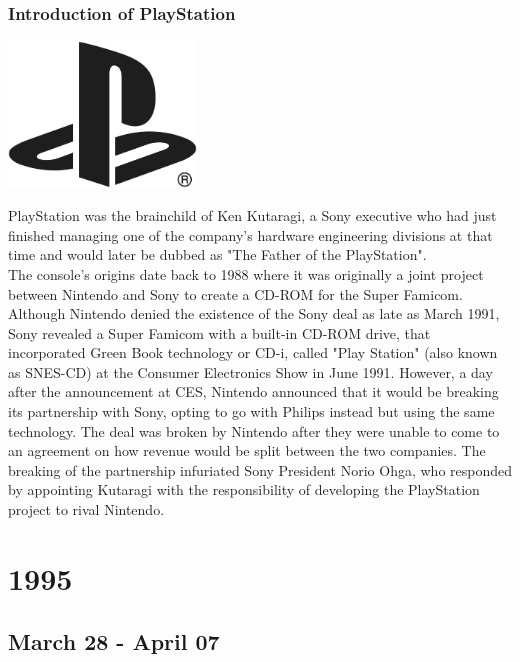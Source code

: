 \documentclass[11pt]{report}
\begin{document}
\subsection{Introduction of PlayStation}
\vspace{2mm}\begin{center}\includegraphics[width=5cm]{./img/playstationLogo.jpg}\end{center}
PlayStation was the brainchild of Ken Kutaragi, a Sony executive who had just finished managing one of the company's hardware engineering divisions at that time and would later be dubbed as "The Father of the PlayStation".\\ \indent The console's origins date back to 1988 where it was originally a joint project between Nintendo and Sony to create a CD-ROM for the Super Famicom. Although Nintendo denied the existence of the Sony deal as late as March 1991, Sony revealed a Super Famicom with a built-in CD-ROM drive, that incorporated Green Book technology or CD-i, called "Play Station" (also known as SNES-CD) at the Consumer Electronics Show in June 1991. However, a day after the announcement at CES, Nintendo announced that it would be breaking its partnership with Sony, opting to go with Philips instead but using the same technology. The deal was broken by Nintendo after they were unable to come to an agreement on how revenue would be split between the two companies. The breaking of the partnership infuriated Sony President Norio Ohga, who responded by appointing Kutaragi with the responsibility of developing the PlayStation project to rival Nintendo.

\chapter{1995}
\section{March 28 - April 07}
\end{document}
